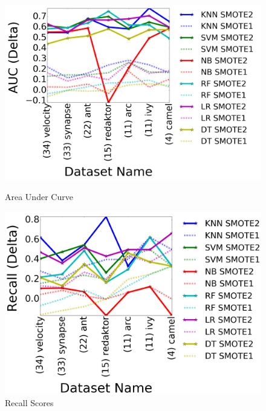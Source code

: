 \begin{figure}[!t]
    \centering
  \begin{minipage}{.49\textwidth}
        \captionsetup{labelsep=space,justification=centering}
        \includegraphics[width=\linewidth]{./fig/AUC_tuned2.png}
  \caption{Area Under Curve}
  \label{AUC}
  \end{minipage}
  \begin{minipage}{.49\textwidth}
        \captionsetup{justification=centering}
        \includegraphics[width=\linewidth]{./fig/Recall_tuned2.png}
  \caption{Recall Scores}
  \label{Recall}
    \end{minipage}%

\end{figure}

